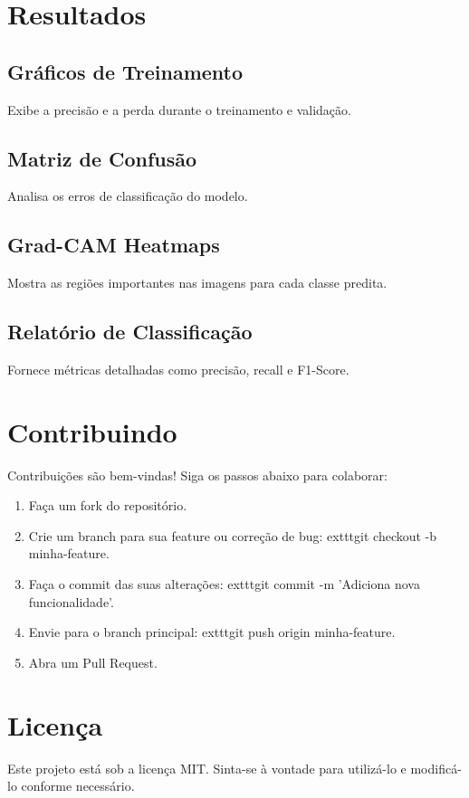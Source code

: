 \documentclass{article}
\begin{document}
\section{Resultados}
\subsection{Gr\'aficos de Treinamento}
Exibe a precis\~ao e a perda durante o treinamento e valida\c{c}\~ao.

\subsection{Matriz de Confus\~ao}
Analisa os erros de classifica\c{c}\~ao do modelo.

\subsection{Grad-CAM Heatmaps}
Mostra as regi\~oes importantes nas imagens para cada classe predita.

\subsection{Relat\'orio de Classifica\c{c}\~ao}
Fornece m\'etricas detalhadas como precis\~ao, recall e F1-Score.

\section{Contribuindo}
Contribui\c{c}\~oes s\~ao bem-vindas! Siga os passos abaixo para colaborar:
\begin{enumerate}
    \item Fa\c{c}a um fork do reposit\'orio.
    \item Crie um branch para sua feature ou corre\c{c}\~ao de bug: 	exttt{git checkout -b minha-feature}.
    \item Fa\c{c}a o commit das suas altera\c{c}\~oes: 	exttt{git commit -m 'Adiciona nova funcionalidade'}.
    \item Envie para o branch principal: 	exttt{git push origin minha-feature}.
    \item Abra um Pull Request.
\end{enumerate}

\section{Licen\c{c}a}
Este projeto est\'a sob a licen\c{c}a MIT. Sinta-se \`a vontade para utiliz\'a-lo e modific\'a-lo conforme necess\'ario.
\end{document}
